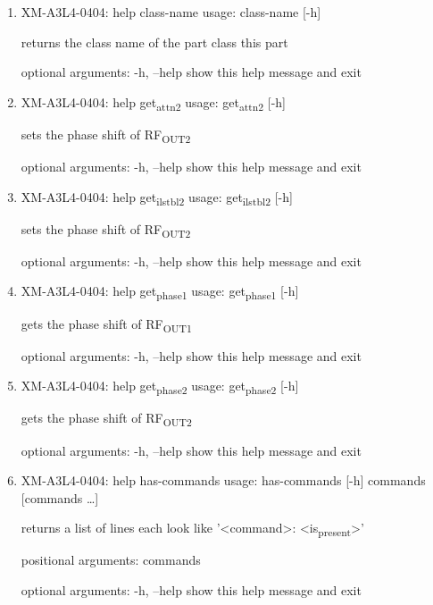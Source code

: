\documentclass[11pt]{article}
\begin{document}
\begin{enumerate}
\item XM-A3L4-0404: help class-name
\label{sec:org9cd7234}
usage: class-name [-h]

returns the class name of the part class this part

optional arguments:
  -h, --help  show this help message and exit

\item XM-A3L4-0404: help get\textsubscript{attn}\textsubscript{2}
\label{sec:org1b53633}
usage: get\textsubscript{attn}\textsubscript{2} [-h]

sets the phase shift of RF\textsubscript{OUT2}

optional arguments:
  -h, --help  show this help message and exit

\item XM-A3L4-0404: help get\textsubscript{il}\textsubscript{stbl}\textsubscript{2}
\label{sec:org3d8558b}
usage: get\textsubscript{il}\textsubscript{stbl}\textsubscript{2} [-h]

sets the phase shift of RF\textsubscript{OUT2}

optional arguments:
  -h, --help  show this help message and exit

\item XM-A3L4-0404: help get\textsubscript{phase}\textsubscript{1}
\label{sec:orgf5c3a87}
usage: get\textsubscript{phase}\textsubscript{1} [-h]

gets the phase shift of RF\textsubscript{OUT1}

optional arguments:
  -h, --help  show this help message and exit

\item XM-A3L4-0404: help get\textsubscript{phase}\textsubscript{2}
\label{sec:org506b22b}
usage: get\textsubscript{phase}\textsubscript{2} [-h]

gets the phase shift of RF\textsubscript{OUT2}

optional arguments:
  -h, --help  show this help message and exit

\item XM-A3L4-0404: help has-commands
\label{sec:orgda50bfc}
usage: has-commands [-h] commands [commands \ldots{}]

returns a list of lines each look like '<command>: <is\textsubscript{present}>'

positional arguments:
  commands

optional arguments:
  -h, --help  show this help message and exit


\end{enumerate}
\end{document}
